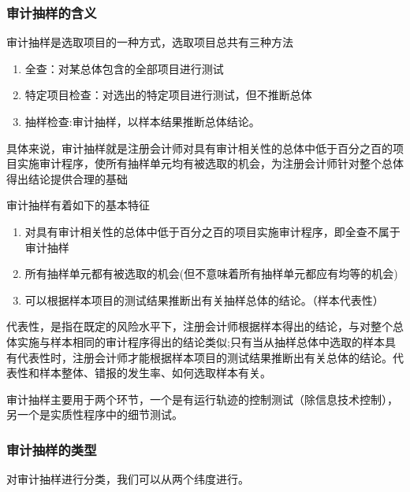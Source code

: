 \documentclass[UTF8,12pt]{ctexart}
\numberwithin{equation}{section} %
\numberwithin{figure}{section}
\numberwithin{table}{section}
\begin{document}
	\subsubsection{审计抽样的含义}
	审计抽样是选取项目的一种方式，选取项目总共有三种方法
	\begin{enumerate}
		\item 全查：对某总体包含的全部项目进行测试
		
		\item 特定项目检查：对选出的特定项目进行测试，但不推断总体
		
		\item 抽样检查:审计抽样，以样本结果推断总体结论。
	\end{enumerate}
	
	具体来说，审计抽样就是注册会计师对具有审计相关性的总体中低于百分之百的项目实施审计程序，使所有抽样单元均有被选取的机会，为注册会计师针对整个总体得出结论提供合理的基础
	
	审计抽样有着如下的基本特征
	\begin{enumerate}
		\item 对具有审计相关性的总体中低于百分之百的项目实施审计程序，即全查不属于审计抽样
		
		\item 所有抽样单元都有被选取的机会(但不意味着所有抽样单元都应有均等的机会)
		
		\item 可以根据样本项目的测试结果推断出有关抽样总体的结论。（样本代表性）
	\end{enumerate}
	
	代表性，是指在既定的风险水平下，注册会计师根据样本得出的结论，与对整个总体实施与样本相同的审计程序得出的结论类似;只有当从抽样总体中选取的样本具有代表性时，注册会计师才能根据样本项目的测试结果推断出有关总体的结论。代表性和样本整体、错报的发生率、如何选取样本有关。
	
	审计抽样主要用于两个环节，一个是有运行轨迹的控制测试（除信息技术控制），另一个是实质性程序中的细节测试。
	
	\subsubsection{审计抽样的类型}
	对审计抽样进行分类，我们可以从两个纬度进行。
\end{document}

